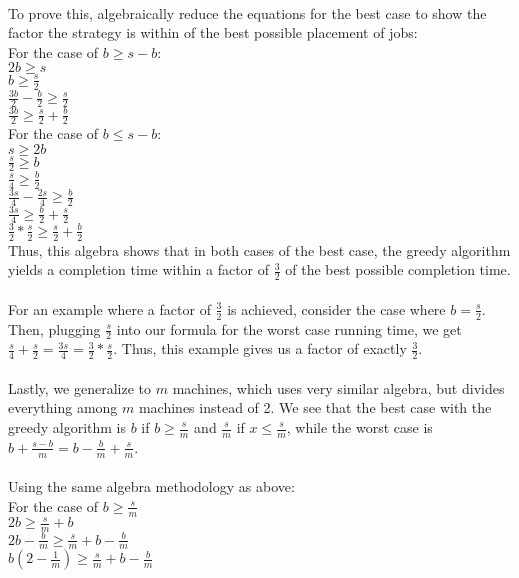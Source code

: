 \documentclass[11pt]{article}
\begin{document}
\begin{enumerate}
\\
To prove this, algebraically reduce the equations for the best case to show the factor the strategy is within of the best possible placement of jobs:\\
For the case of $b \geq s - b$: \\
$2b \geq s$  \\
$b \geq \frac{s}{2}$ \\
$\frac{3b}{2} - \frac{b}{2} \geq \frac{s}{2}$ \\
$\frac{3b}{2} \geq \frac{s}{2} + \frac{b}{2}$ \\
For the case of $b \leq s - b$: \\
$s \geq 2b$ \\
$\frac{s}{2} \geq b$ \\
$\frac{s}{4} \geq \frac{b}{2}$ \\
$\frac{3s}{4} - \frac{2s}{4} \geq \frac{b}{2}$ \\
$\frac{3s}{4} \geq \frac{b}{2} + \frac{s}{2}$ \\
$\frac{3}{2} * \frac{s}{2} \geq \frac{s}{2} + \frac{b}{2}$ \\
Thus, this algebra shows that in both cases of the best case, the greedy algorithm yields a completion time within a factor of $\frac{3}{2}$ of the best possible completion time. \\
\\
For an example where a factor of $\frac{3}{2}$ is achieved, consider the case where $b = \frac{s}{2}$. Then, plugging $\frac{s}{2}$ into our formula for the worst case running time, we get $\frac{s}{4} + \frac{s}{2} = \frac{3s}{4} = \frac{3}{2} * \frac{s}{2}$. Thus, this example gives us a factor of exactly $\frac{3}{2}$. \\
\\
Lastly, we generalize to $m$ machines, which uses very similar algebra, but divides everything among $m$ machines instead of 2. We see that the best case with the greedy algorithm is $b$ if $b \geq \frac{s}{m}$ and $\frac{s}{m}$ if $x \leq \frac{s}{m}$, while the worst case is $b + \frac{s-b}{m} = b - \frac{b}{m} + \frac{s}{m}$. \\\\
Using the same algebra methodology as above:\\
For the case of $b \geq \frac{s}{m}$ \\
$2b \geq \frac{s}{m} + b$ \\
$2b - \frac{b}{m} \geq \frac{s}{m} + b - \frac{b}{m}$ \\
$b(2 - \frac{1}{m}) \geq \frac{s}{m} + b - \frac{b}{m}$ \\

\end{enumerate}
\end{document}
